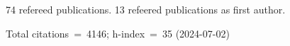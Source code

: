 74 refereed publications. 13 refeered publications as first author.

Total citations~=~4146; h-index~=~35 (2024-07-02)